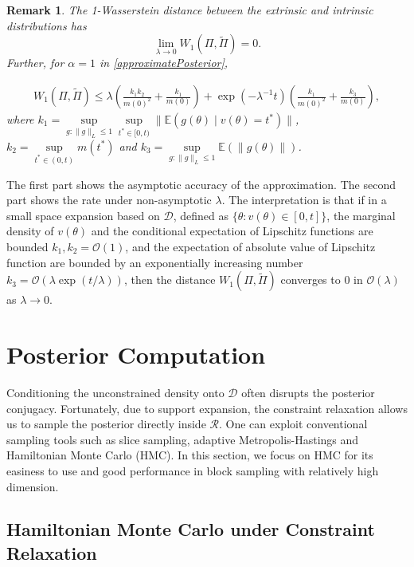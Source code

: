 \documentclass[10pt]{article}
\newtheorem{remark}{Remark}
\newcommand{\mc}[1]{\mathcal{#1}}
\DeclareMathOperator{\1}{\mathbbm{1}}
\begin{document}
\begin{remark}
The 1-Wasserstein distance between the extrinsic and intrinsic distributions has
$$ \underset{\lambda \rightarrow 0}\lim W_1(\Pi,\tilde\Pi)=0.$$
Further, for $\alpha=1$ in \eqref{approximatePosterior},

\begin{equation}
\begin{aligned}
W_1(\Pi,\tilde\Pi) \le \lambda (\frac{k_1 k_2}{m(0)^2} + \frac{k_1}{m(0)}) + \exp(- \lambda^{-1} t )(\frac{k_1}{m(0)^2} + \frac{k_3}{m(0)}),
\end{aligned}
\end{equation}
where $k_1=\underset{g:\|g\|_L\le 1}\sup\underset{t^*\in [0,t)}\sup \|\mathbb{E}(g(\theta) \mid v(\theta)=t^*)\|$, $k_2= \underset{t^*\in (0,t)}\sup  m(t^{*})$ and $k_3=\underset{g:\|g\|_L\le 1} \sup \mathbb{E}(\| g(\theta )\|)$.
\end{remark}

The first part shows the asymptotic accuracy of the approximation. The second part shows the rate under non-asymptotic $\lambda$. The interpretation is that if in a small space expansion based on $\mc D$, defined as $\{\theta: v(\theta)\in [0,t] \}$, the marginal density of $v(\theta)$ and the conditional expectation of Lipschitz functions are bounded $k_1,k_2= \mc O(1)$, and the expectation of absolute value of Lipschitz function are bounded by an exponentially increasing number $k_3 = \mc O(\lambda \exp(t/\lambda))$, then the distance $W_1(\Pi,\tilde\Pi)$ converges to $0$ in $\mc O(\lambda)$ as $\lambda\rightarrow 0$.



\section{Posterior Computation}

Conditioning the unconstrained density onto $\mc D$ often disrupts the posterior conjugacy. Fortunately, due to support expansion, the constraint relaxation allows us to sample the posterior directly inside $\mc R$. One can exploit conventional sampling tools such as slice sampling, adaptive Metropolis-Hastings and Hamiltonian Monte Carlo (HMC). In this section, we focus on HMC for its easiness to use and good performance in block sampling with relatively high dimension.

\subsection{Hamiltonian Monte Carlo under Constraint Relaxation}
\end{document}

